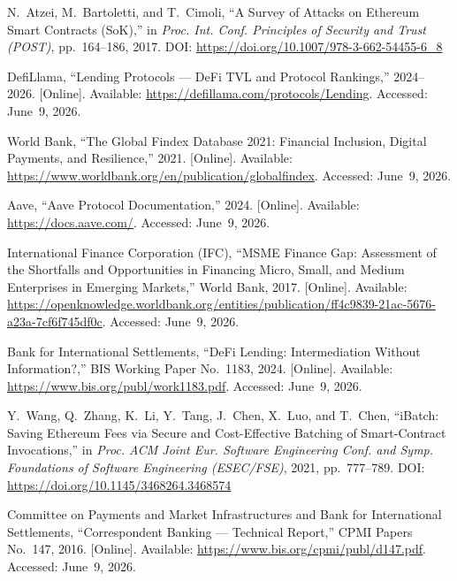 \documentclass[12pt, a4paper]{report}
\begin{document}
{\begin{enumerate}[label={[\arabic*]}]
\item N.~Atzei, M.~Bartoletti, and T.~Cimoli, ``A Survey of Attacks on Ethereum Smart Contracts (SoK),'' in \textit{Proc. Int. Conf. Principles of Security and Trust (POST)}, pp.~164--186, 2017. DOI: \url{https://doi.org/10.1007/978-3-662-54455-6_8}

\item DefiLlama, ``Lending Protocols --- DeFi TVL and Protocol Rankings,'' 2024--2026. [Online]. Available: \url{https://defillama.com/protocols/Lending}. Accessed: June~9, 2026.

\item World Bank, ``The Global Findex Database 2021: Financial Inclusion, Digital Payments, and Resilience,'' 2021. [Online]. Available: \url{https://www.worldbank.org/en/publication/globalfindex}. Accessed: June~9, 2026.

\item Aave, ``Aave Protocol Documentation,'' 2024. [Online]. Available: \url{https://docs.aave.com/}. Accessed: June~9, 2026.

\item International Finance Corporation (IFC), ``MSME Finance Gap: Assessment of the Shortfalls and Opportunities in Financing Micro, Small, and Medium Enterprises in Emerging Markets,'' World Bank, 2017. [Online]. Available: \url{https://openknowledge.worldbank.org/entities/publication/ff4c9839-21ac-5676-a23a-7cf6f745df0c}. Accessed: June~9, 2026.

\item Bank for International Settlements, ``DeFi Lending: Intermediation Without Information?,'' BIS Working Paper No.~1183, 2024. [Online]. Available: \url{https://www.bis.org/publ/work1183.pdf}. Accessed: June~9, 2026.

\item Y.~Wang, Q.~Zhang, K.~Li, Y.~Tang, J.~Chen, X.~Luo, and T.~Chen, ``iBatch: Saving Ethereum Fees via Secure and Cost-Effective Batching of Smart-Contract Invocations,'' in \textit{Proc. ACM Joint Eur. Software Engineering Conf. and Symp. Foundations of Software Engineering (ESEC/FSE)}, 2021, pp.~777--789. DOI: \url{https://doi.org/10.1145/3468264.3468574}

\item Committee on Payments and Market Infrastructures and Bank for International Settlements, ``Correspondent Banking --- Technical Report,'' CPMI Papers No.~147, 2016. [Online]. Available: \url{https://www.bis.org/cpmi/publ/d147.pdf}. Accessed: June~9, 2026.


\end{enumerate}}
\end{document}
